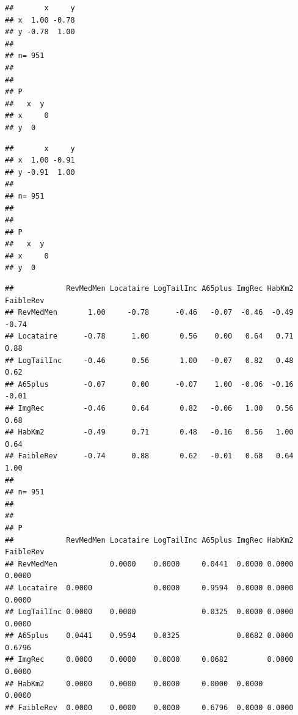 \documentclass[
  11pt,
  french,
]{book}
\makeatletter
\newenvironment{Shaded}{\begin{snugshade}}{\end{snugshade}}
\newcommand{\CommentTok}[1]{\textcolor[rgb]{0.56,0.35,0.01}{\textit{#1}}}
\newcommand{\DataTypeTok}[1]{\textcolor[rgb]{0.13,0.29,0.53}{#1}}
\newcommand{\KeywordTok}[1]{\textcolor[rgb]{0.13,0.29,0.53}{\textbf{#1}}}
\newcommand{\NormalTok}[1]{#1}
\newcommand{\OperatorTok}[1]{\textcolor[rgb]{0.81,0.36,0.00}{\textbf{#1}}}
\newcommand{\StringTok}[1]{\textcolor[rgb]{0.31,0.60,0.02}{#1}}
\newenvironment{kframe}{%
\medskip{}
\setlength{\fboxsep}{.8em}
 \def\at@end@of@kframe{}%
 \ifinner\ifhmode%
  \def\at@end@of@kframe{\end{minipage}}%
  \begin{minipage}{\columnwidth}%
 \fi\fi%
 \def\FrameCommand##1{\hskip\@totalleftmargin \hskip-\fboxsep
 \colorbox{shadecolor}{##1}\hskip-\fboxsep
     \hskip-\linewidth \hskip-\@totalleftmargin \hskip\columnwidth}%
 \MakeFramed {\advance\hsize-\width
   \@totalleftmargin\z@ \linewidth\hsize
   \@setminipage}}%
 {\par\unskip\endMakeFramed%
 \at@end@of@kframe}
\renewenvironment{Shaded}{\begin{kframe}}{\end{kframe}}
\makeatother
\begin{document}
\begin{verbatim}
##       x     y
## x  1.00 -0.78
## y -0.78  1.00
## 
## n= 951 
## 
## 
## P
##   x  y 
## x     0
## y  0
\end{verbatim}

\begin{Shaded}
\end{Shaded}

\begin{verbatim}
##       x     y
## x  1.00 -0.91
## y -0.91  1.00
## 
## n= 951 
## 
## 
## P
##   x  y 
## x     0
## y  0
\end{verbatim}

\begin{Shaded}
\end{Shaded}

\begin{verbatim}
##            RevMedMen Locataire LogTailInc A65plus ImgRec HabKm2 FaibleRev
## RevMedMen       1.00     -0.78      -0.46   -0.07  -0.46  -0.49     -0.74
## Locataire      -0.78      1.00       0.56    0.00   0.64   0.71      0.88
## LogTailInc     -0.46      0.56       1.00   -0.07   0.82   0.48      0.62
## A65plus        -0.07      0.00      -0.07    1.00  -0.06  -0.16     -0.01
## ImgRec         -0.46      0.64       0.82   -0.06   1.00   0.56      0.68
## HabKm2         -0.49      0.71       0.48   -0.16   0.56   1.00      0.64
## FaibleRev      -0.74      0.88       0.62   -0.01   0.68   0.64      1.00
## 
## n= 951 
## 
## 
## P
##            RevMedMen Locataire LogTailInc A65plus ImgRec HabKm2 FaibleRev
## RevMedMen            0.0000    0.0000     0.0441  0.0000 0.0000 0.0000   
## Locataire  0.0000              0.0000     0.9594  0.0000 0.0000 0.0000   
## LogTailInc 0.0000    0.0000               0.0325  0.0000 0.0000 0.0000   
## A65plus    0.0441    0.9594    0.0325             0.0682 0.0000 0.6796   
## ImgRec     0.0000    0.0000    0.0000     0.0682         0.0000 0.0000   
## HabKm2     0.0000    0.0000    0.0000     0.0000  0.0000        0.0000   
## FaibleRev  0.0000    0.0000    0.0000     0.6796  0.0000 0.0000
\end{verbatim}
\end{document}

